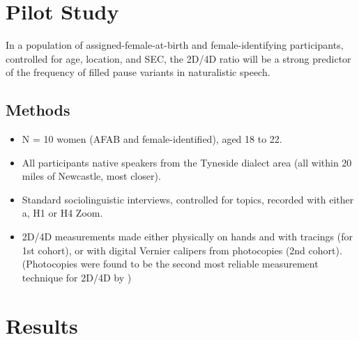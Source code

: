 \documentclass[a0,portrait]{a0poster}
\begin{document}
\begin{multicols}{2}

\section*{Pilot Study}


In a population of assigned-female-at-birth and female-identifying participants, controlled for age, location, and SEC, the 2D/4D ratio will be a strong predictor of the frequency of filled pause variants in naturalistic speech.

\subsection*{Methods}
\begin{itemize}
	\item N = 10 women (AFAB and female-identified), aged 18 to 22.
	\item All participants native speakers from the Tyneside dialect area (all within 20 miles of Newcastle, most closer).
	\item Standard sociolinguistic interviews, controlled for topics, recorded with either a, H1 or H4 Zoom.
	\item 2D/4D measurements made either physically on hands and with tracings (for 1st cohort), or with digital Vernier calipers from photocopies (2nd cohort). (Photocopies were found to be the second most reliable measurement technique for 2D/4D by \citealt{allawayetal2009})
\end{itemize}



\section*{Results}




\end{multicols}
\end{document}
